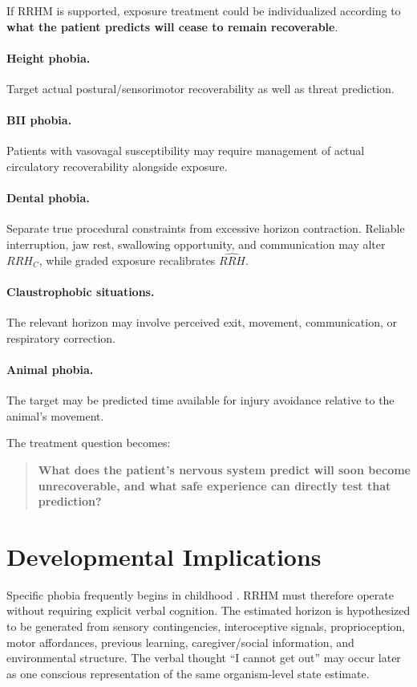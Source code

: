 \documentclass[11pt]{article}
\begin{document}
If RRHM is supported, exposure treatment could be individualized according to \textbf{what the patient predicts will cease to remain recoverable}.

\paragraph{Height phobia.} Target actual postural/sensorimotor recoverability as well as threat prediction.

\paragraph{BII phobia.} Patients with vasovagal susceptibility may require management of actual circulatory recoverability alongside exposure.

\paragraph{Dental phobia.} Separate true procedural constraints from excessive horizon contraction. Reliable interruption, jaw rest, swallowing opportunity, and communication may alter $RRH_C$, while graded exposure recalibrates $\widehat{RRH}$.

\paragraph{Claustrophobic situations.} The relevant horizon may involve perceived exit, movement, communication, or respiratory correction.

\paragraph{Animal phobia.} The target may be predicted time available for injury avoidance relative to the animal's movement.

The treatment question becomes:
\begin{quote}
\textbf{What does the patient's nervous system predict will soon become unrecoverable, and what safe experience can directly test that prediction?}
\end{quote}

\section{Developmental Implications}

Specific phobia frequently begins in childhood \cite{wardenaar2017}. RRHM must therefore operate without requiring explicit verbal cognition. The estimated horizon is hypothesized to be generated from sensory contingencies, interoceptive signals, proprioception, motor affordances, previous learning, caregiver/social information, and environmental structure. The verbal thought ``I cannot get out'' may occur later as one conscious representation of the same organism-level state estimate.
\end{document}
